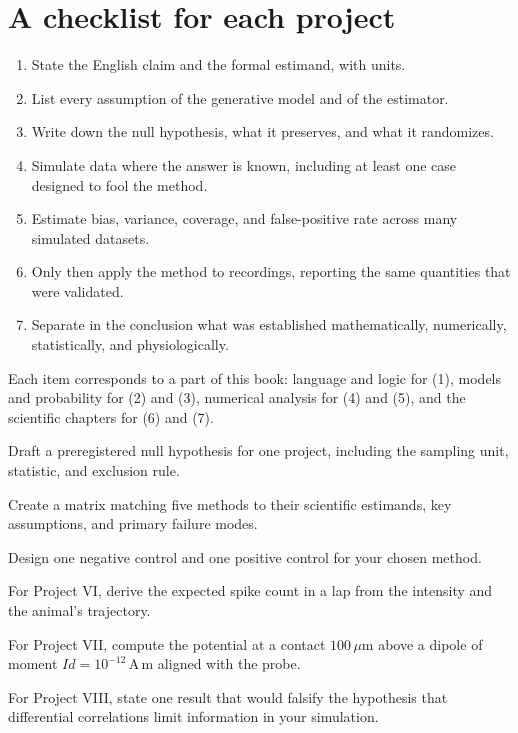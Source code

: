 \section{A checklist for each project}
\begin{enumerate}[leftmargin=2em]
\item State the English claim and the formal estimand, with units.
\item List every assumption of the generative model and of the estimator.
\item Write down the null hypothesis, what it preserves, and what it randomizes.
\item Simulate data where the answer is known, including at least one case designed to fool the method.
\item Estimate bias, variance, coverage, and false-positive rate across many simulated datasets.
\item Only then apply the method to recordings, reporting the same quantities that were validated.
\item Separate in the conclusion what was established mathematically, numerically, statistically, and physiologically.
\end{enumerate}
Each item corresponds to a part of this book: language and logic for (1), models and probability for (2) and (3), numerical analysis for (4) and (5), and the scientific chapters for (6) and (7).
\begin{exercises}
\item Draft a preregistered null hypothesis for one project, including the sampling unit, statistic, and exclusion rule.
\item Create a matrix matching five methods to their scientific estimands, key assumptions, and primary failure modes.
\item Design one negative control and one positive control for your chosen method.
\item For Project VI, derive the expected spike count in a lap from the intensity and the animal's trajectory.
\item For Project VII, compute the potential at a contact $100\,\mu$m above a dipole of moment $Id=10^{-12}$\,A\,m aligned with the probe.
\item For Project VIII, state one result that would falsify the hypothesis that differential correlations limit information in your simulation.
\end{exercises}
